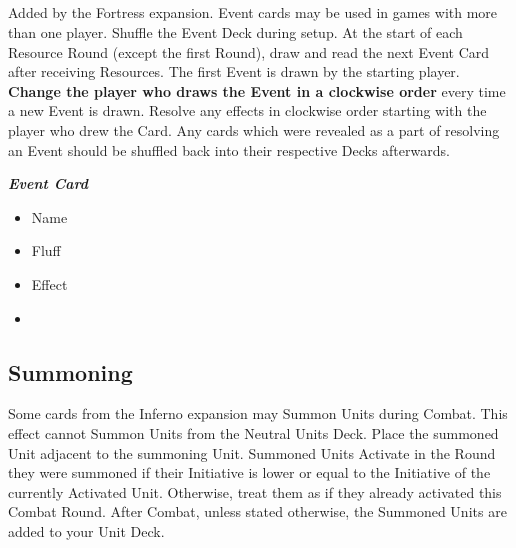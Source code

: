 \begin{multicols*}{2}
\vspace*{\fill}
\columnbreak
\subsection*{}
Added by the Fortress expansion.
Event cards may be used in games with more than one player.
Shuffle the Event Deck during setup.
At the start of each Resource Round (except the first Round), draw and read the next Event Card after receiving Resources.
The first Event is drawn by the starting player.
\textbf{Change the player who draws the Event in a clockwise order} every time a new Event is drawn.
Resolve any effects in clockwise order starting with the player who drew the Card.
Any cards which were revealed as a part of resolving an Event should be shuffled back into their respective Decks afterwards.

\medskip

\begin{minipage}[h]{\linewidth}
  \vspace{0.1pt}
  \centering
  \begin{scriptsize}
  \end{scriptsize}
  \footnotesize
  \textbf{\textit{\textcolor{darkcandyapplered}{Event Card}}}
  \begin{multicols}{2}
    \begin{itemize}
      \item[\textbf{1.}] Name
      \item[\textbf{2.}] Fluff
      \item[\textbf{3.}] Effect
      \item[\textbf{\phantom{.}}] \phantom{.}
    \end{itemize}
  \end{multicols}
\end{minipage}

\subsection*{Summoning}
Some cards from the Inferno expansion may Summon Units during Combat.
This effect cannot Summon Units from the Neutral Units Deck.
Place the summoned Unit adjacent to the summoning Unit.
Summoned Units Activate in the Round they were summoned if their Initiative is lower or equal to the Initiative of the currently Activated Unit.
Otherwise, treat them as if they already activated this Combat Round.
After Combat, unless stated otherwise, the Summoned Units are added to your Unit Deck.


\end{multicols*}
